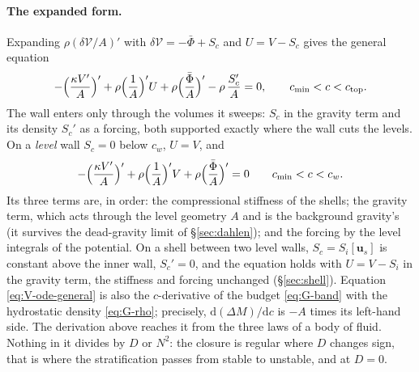 \documentclass[11pt]{article}
\theoremstyle{definition}
\theoremstyle{remark}
\newcommand{\bu}{\mathbf{u}}
\newcommand{\Vol}{\mathcal V}
\begin{document}
\paragraph{The expanded form.} Expanding $\rho(\delta\Vol/A)'$ with
$\delta\Vol = -\bar\Phi + S_c$ and $U = V - S_c$ gives the general
equation
\begin{equation}
  -\Bigl(\frac{\kappa V'}{A}\Bigr)' + \rho\Bigl(\frac1A\Bigr)'U
  + \rho\Bigl(\frac{\bar\Phi}{A}\Bigr)' - \rho\,\frac{S_c'}{A} = 0 ,
  \qquad c_{\min} < c < c_{\mathrm{top}} .
  \label{eq:V-ode-general}
\end{equation}
The wall enters only through the volumes it sweeps: $S_c$ in the
gravity term and its density $S_c'$ as a forcing, both supported
exactly where the wall cuts the levels. On a \emph{level} wall $S_c =
0$ below $c_w$, $U = V$, and
\begin{equation}
  -\Bigl(\frac{\kappa V'}{A}\Bigr)' + \rho\Bigl(\frac1A\Bigr)'V
  + \rho\Bigl(\frac{\bar\Phi}{A}\Bigr)' = 0
  \qquad c_{\min} < c < c_w .
  \label{eq:V-ode}
\end{equation}
Its three terms are, in order: the compressional stiffness of the
shells; the gravity term, which acts through the level geometry $A$
and is the background gravity's (it survives the dead-gravity limit of
\S\ref{sec:dahlen}); and the forcing by the level integrals of the
potential. On a shell between two level walls, $S_c = S_i[\bu_s]$ is
constant above the inner wall, $S_c' = 0$, and the equation holds with
$U = V - S_i$ in the gravity term, the stiffness and forcing
unchanged (\S\ref{sec:shell}). Equation
\eqref{eq:V-ode-general} is also the $c$-derivative of the
budget \eqref{eq:G-band} with the hydrostatic density \eqref{eq:G-rho};
precisely, $\mathrm d(\Delta M)/\mathrm dc$ is $-A$ times its left-hand
side. The derivation above reaches it from the three laws of a body of
fluid. Nothing in it divides by $D$ or $N^2$: the closure is regular
where $D$ changes sign, that is where the stratification passes from
stable to unstable, and at $D = 0$.
\end{document}
